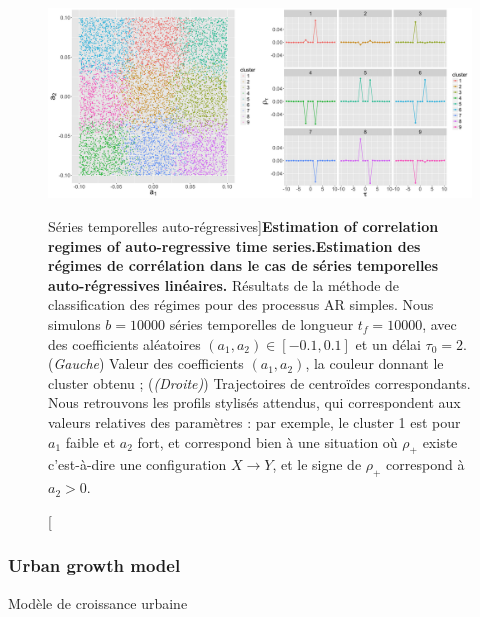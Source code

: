 \begin{figure}
	\includegraphics[width=\linewidth]{Figures/Final/4-2-2-fig-causalityregimes-arma.jpg}
	\caption[Auto-regressive time-series][Séries temporelles auto-régressives]{\textbf{Estimation of correlation regimes of auto-regressive time series.}\label{fig:causalityregimes:arma}}{\textbf{Estimation des régimes de corrélation dans le cas de séries temporelles auto-régressives linéaires.} Résultats de la méthode de classification des régimes pour des processus AR simples. Nous simulons $b = 10000$ séries temporelles de longueur $t_f = 10000$, avec des coefficients aléatoires $(a_1,a_2) \in [-0.1,0.1]$ et un délai $\tau_0 = 2$. (\textit{Gauche}) Valeur des coefficients $(a_1,a_2)$, la couleur donnant le cluster obtenu ; (\textit{(Droite)}) Trajectoires de centroïdes correspondants. Nous retrouvons les profils stylisés attendus, qui correspondent aux valeurs relatives des paramètres : par exemple, le cluster 1 est pour $a_1$ faible et $a_2$ fort, et correspond bien à une situation où $\rho_+$ existe c'est-à-dire une configuration $X\rightarrow Y$, et le signe de $\rho_+$ correspond à $a_2 >0$. \label{fig:causalityregimes:arma}}
\end{figure}



\subsubsection{Urban growth model}{Modèle de croissance urbaine}

